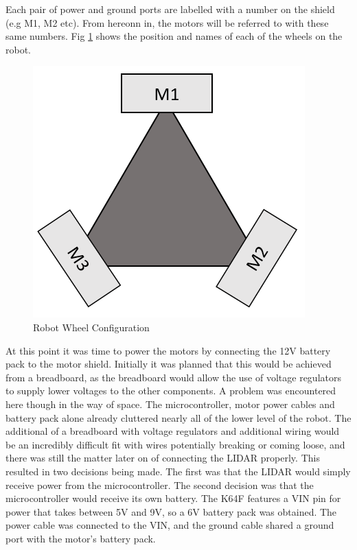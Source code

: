 				Each pair of power and ground ports are labelled with a number on the shield (e.g M1, M2 etc). From hereonn in, the motors will be referred to with these same numbers. Fig \ref{fig:robotwheels} shows the position and names of each of the wheels on the robot.
				\begin{figure}[h]
					\centering
					\includegraphics[width=.5\linewidth]{SYNTHESIS/robotwheels.png}
					\caption{Robot Wheel Configuration}
					\label{fig:robotwheels}
				\end{figure}	
				
				At this point it was time to power the motors by connecting the 12V battery pack to the motor shield. Initially it was planned that this would be achieved from a breadboard, as the breadboard would allow the use of voltage regulators to supply lower voltages to the other components. A problem was encountered here though in the way of space. The microcontroller, motor power cables and battery pack alone already cluttered nearly all of the lower level of the robot. The additional of a breadboard with voltage regulators and additional wiring would be an incredibly difficult fit with wires potentially breaking or coming loose, and there was still the matter later on of connecting the LIDAR properly. This resulted in two decisions being made. The first was that the LIDAR would simply receive power from the microcontroller. The second decision was that the microcontroller would receive its own battery. The K64F features a VIN pin for power that takes between 5V and 9V, so a 6V battery pack was obtained. The power cable was connected to the VIN, and the ground cable shared a ground port with the motor's battery pack. 
				
